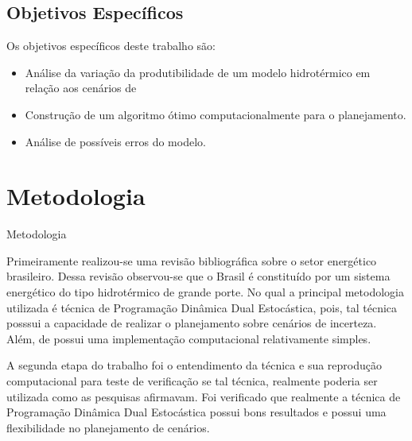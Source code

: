 \documentclass[12pt]{beamer}%
\begin{document}
\begin{frame}
	\begin{justify}	
	\subsection{Objetivos Espec\'ificos}
	Os objetivos espec\'ificos deste trabalho s\~ao:
	\begin{itemize}
		\justifying
	\item An\'alise da varia\c c\~ao da produtibilidade de um modelo hidrot\'ermico em rela\c c\~ao aos cen\'arios de
		\item Constru\c c\~ao de um algoritmo \'otimo  computacionalmente para o planejamento. 
		\item An\'alise de poss\'iveis erros do modelo.
	\end{itemize}
	\end{justify}
\end{frame}

\section{Metodologia}
\begin{frame}{Metodologia}
	\begin{justify}	
		Primeiramente realizou-se uma revis\~ao bibliogr\'afica sobre o setor energ\'etico brasileiro. Dessa revis\~ao
		observou-se que o Brasil \'e constitu\'ido por um sistema energ\'etico do tipo hidrot\'ermico de grande porte. No qual a
		principal metodologia utilizada \'e t\'ecnica de Programa\c c\~ao Din\^amica Dual Estoc\'astica, pois, tal t\'ecnica
		posssui a capacidade de realizar o planejamento sobre cen\'arios de incerteza. Al\'em, de possui uma implementa\c c\~ao
		computacional relativamente simples.
	\end{justify}
\end{frame}

\begin{frame}
	\begin{justify}	
	A segunda etapa do trabalho foi o entendimento da t\'ecnica e sua reprodu\c c\~ao computacional para teste de verifica\c
	c\~ao se tal t\'ecnica, realmente poderia ser utilizada como as pesquisas afirmavam. Foi verificado que realmente a
	t\'ecnica de Programa\c c\~ao Din\^amica Dual Estoc\'astica possui bons resultados e possui uma flexibilidade no
	planejamento de cen\'arios. 
	\end{justify}
\end{frame}
\end{document}
